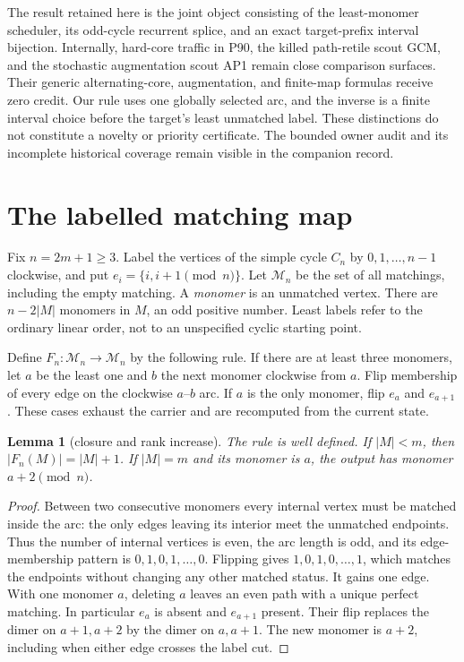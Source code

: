 \documentclass[a4paper,10pt]{amsart}
\newtheorem{lemma}[theorem]{Lemma}
\theoremstyle{remark}
\newcommand{\calM}{\mathcal M}
\begin{document}
The result retained here is the joint object consisting of the
least-monomer scheduler, its odd-cycle recurrent splice, and an exact
target-prefix interval bijection. Internally, hard-core traffic in P90,
the killed path-retile scout GCM, and the stochastic augmentation scout
AP1 remain close comparison surfaces. Their generic alternating-core,
augmentation, and finite-map formulas receive zero credit. Our rule uses
one globally selected arc, and the inverse is a finite interval choice
before the target's least unmatched label. These distinctions do not
constitute a novelty or priority certificate. The bounded owner audit and
its incomplete historical coverage remain visible in the companion record.

\section{The labelled matching map}
Fix $n=2m+1\ge3$. Label the vertices of the simple cycle $C_n$ by
$0,1,\ldots,n-1$ clockwise, and put $e_i=\{i,i+1\pmod n\}$.
Let $\calM_n$ be the set of all matchings, including the empty matching.
A \emph{monomer} is an unmatched vertex. There are $n-2|M|$ monomers in
$M$, an odd positive number. Least labels refer to the ordinary linear
order, not to an unspecified cyclic starting point.

Define $F_n:\calM_n\to\calM_n$ by the following rule. If there are at
least three monomers, let $a$ be the least one and $b$ the next monomer
clockwise from $a$. Flip membership of every edge on the clockwise
$a$--$b$ arc. If $a$ is the only monomer, flip $e_a$ and $e_{a+1}$.
These cases exhaust the carrier and are recomputed from the current state.

\begin{lemma}[closure and rank increase]\label{lem:closure}
The rule is well defined. If $|M|<m$, then $|F_n(M)|=|M|+1$.
If $|M|=m$ and its monomer is $a$, the output has monomer $a+2\pmod n$.
\end{lemma}
\begin{proof}
Between two consecutive monomers every internal vertex must be matched
inside the arc: the only edges leaving its interior meet the unmatched
endpoints. Thus the number of internal vertices is even, the arc length
is odd, and its edge-membership pattern is
$0,1,0,1,\ldots,0$. Flipping gives $1,0,1,0,\ldots,1$, which matches the
endpoints without changing any other matched status. It gains one edge.
With one monomer $a$, deleting $a$ leaves an even path with a unique
perfect matching. In particular $e_a$ is absent and $e_{a+1}$ present.
Their flip replaces the dimer on $a+1,a+2$ by the dimer on $a,a+1$.
The new monomer is $a+2$, including when either edge crosses the label cut.
\end{proof}
\end{document}
